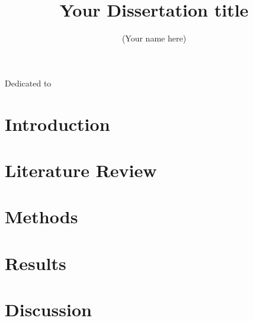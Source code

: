 \documentclass[12pt, onehalfspacing]{utexasthesis}
\title{Your Dissertation title}
\author{(Your name here)}
\begin{document}

\maketitle

\begin{dedication}
Dedicated to 
\end{dedication}


\begin{acknowledgments}

\end{acknowledgments}

\begin{abstract}

\end{abstract}

\maketableofcontents

\chapter{Introduction}


\chapter{Literature Review}


\chapter{Methods}


\chapter{Results}


\chapter{Discussion}


%

\renewcommand{\bibname}{References}
\printbibliography 
\end{document}
